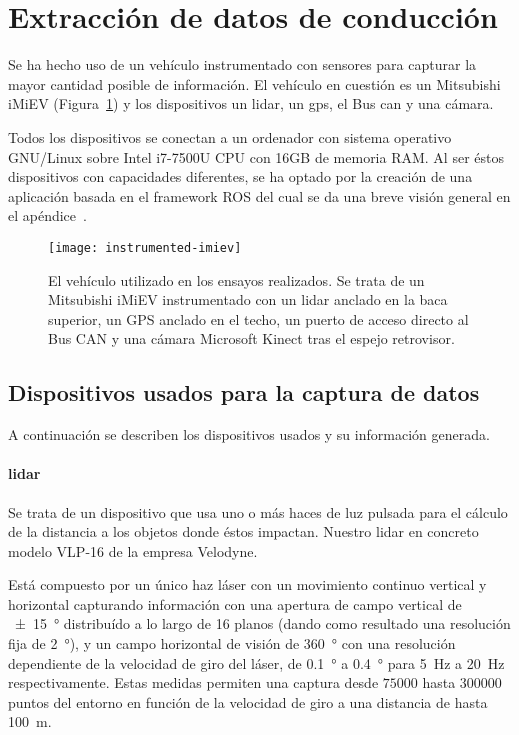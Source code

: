 \section{Extracción de datos de conducción}

Se ha hecho uso de un vehículo instrumentado con sensores para capturar la mayor cantidad posible de información. El vehículo en cuestión es un Mitsubishi iMiEV (Figura~\ref{fig:instrumented-imiev}) y los dispositivos un \Acrfull{lidar}, un \Acrfull{gps}, el Bus \Acrfull{can} y una cámara.

Todos los dispositivos se conectan a un ordenador con sistema operativo GNU/Linux sobre Intel i7-7500U CPU con 16GB de memoria RAM. Al ser éstos dispositivos con capacidades diferentes, se ha optado por la creación de una aplicación basada en el framework ROS del cual se da una breve visión general en el apéndice~.

\begin{figure}[t]
	\centering
	\texttt{[image: instrumented-imiev]}
	\caption[Vehículo instrumentado utilizado en los ensayos]{El vehículo utilizado en los ensayos realizados. Se trata de un Mitsubishi iMiEV instrumentado con un \acrshort{lidar} anclado en la baca superior, un GPS anclado en el techo, un puerto de acceso directo al Bus CAN y una cámara Microsoft Kinect tras el espejo retrovisor.}
	\label{fig:instrumented-imiev}
\end{figure}

\subsection{Dispositivos usados para la captura de datos}

A continuación se describen los dispositivos usados y su información generada.

\paragraph{\acrshort{lidar}}

Se trata de un dispositivo que usa uno o más haces de luz pulsada para el cálculo de la distancia a los objetos donde éstos impactan. Nuestro \acrshort{lidar} en concreto modelo VLP-16 de la empresa Velodyne.

Está compuesto por un único haz láser con un movimiento continuo vertical y horizontal capturando información con una apertura de campo vertical de \SI{\pm15}{\degree} distribuído a lo largo de 16 planos (dando como resultado una resolución fija de \SI{2}{\degree}), y un campo horizontal de visión de \SI{360}{\degree} con una resolución dependiente de la velocidad de giro del láser, de \SI{0.1}{\degree} a \SI{0.4}{\degree} para \SI{5}{\Hz} a \SI{20}{\Hz} respectivamente. Estas medidas permiten una captura desde $75000$ hasta $300000$ puntos del entorno en función de la velocidad de giro a una distancia de hasta \SI{100}{\meter}.

